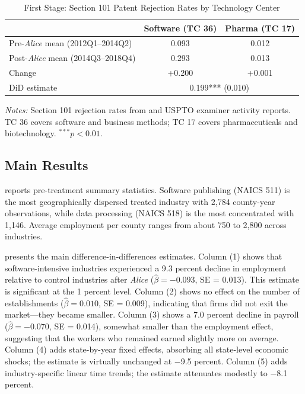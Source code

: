 \documentclass[12pt]{article}
\begin{document}
\begin{table}[t]
\centering
\caption{First Stage: Section 101 Patent Rejection Rates by Technology Center}
\label{tab:firststage}
\begin{tabular}{lcc}
\toprule
 & Software (TC 36) & Pharma (TC 17) \\
\midrule
Pre-\textit{Alice} mean (2012Q1--2014Q2) & 0.093 & 0.012 \\
Post-\textit{Alice} mean (2014Q3--2018Q4) & 0.293 & 0.013 \\
\midrule
Change & +0.200 & +0.001 \\
DiD estimate & \multicolumn{2}{c}{0.199*** (0.010)} \\
\bottomrule
\end{tabular}
\begin{tablenotes}
\item \textit{Notes:} Section 101 rejection rates from \citet{allison2015patent} and USPTO examiner activity reports. TC 36 covers software and business methods; TC 17 covers pharmaceuticals and biotechnology. $^{***}p<0.01$.
\end{tablenotes}
\end{table}

\subsection{Main Results}

 reports pre-treatment summary statistics. Software publishing (NAICS 511) is the most geographically dispersed treated industry with 2,784 county-year observations, while data processing (NAICS 518) is the most concentrated with 1,146. Average employment per county ranges from about 750 to 2,800 across industries.



 presents the main difference-in-differences estimates. Column (1) shows that software-intensive industries experienced a 9.3 percent decline in employment relative to control industries after \textit{Alice} ($\hat{\beta} = -0.093$, SE = 0.013). This estimate is significant at the 1 percent level. Column (2) shows no effect on the number of establishments ($\hat{\beta} = 0.010$, SE = 0.009), indicating that firms did not exit the market---they became smaller. Column (3) shows a 7.0 percent decline in payroll ($\hat{\beta} = -0.070$, SE = 0.014), somewhat smaller than the employment effect, suggesting that the workers who remained earned slightly more on average. Column (4) adds state-by-year fixed effects, absorbing all state-level economic shocks; the estimate is virtually unchanged at $-$9.5 percent. Column (5) adds industry-specific linear time trends; the estimate attenuates modestly to $-$8.1 percent.
\end{document}
